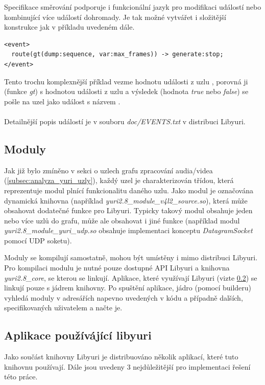 \documentclass[thesis=M,czech]{FITthesis}[2012/06/26]
\begin{document}
Specifikace směrování podporuje i funkcionální jazyk pro modifikaci událostí nebo kombinující více událostí dohromady. Je tak možné vytvářet i složitější konstrukce jak v příkladu uvedeném dále.
\\
\lstset{language=XML}
\begin{lstlisting}
<event>
  route(gt(dump:sequence, var:max_frames)) -> generate:stop;
</event>
\end{lstlisting}

Tento trochu komplexnější příklad vezme hodnotu události  z uzlu , porovná ji (funkce \textit{gt}) s hodnotou události  z uzlu  a výsledek (hodnota \textit{true} nebo \textit{false}) se pošle na uzel  jako událost s názvem .
\\ \\
Detailnější popis událostí je v souboru \textit{doc/EVENTS.txt} v distribuci Libyuri.
	
\subsection{Moduly} \label{subsec:analyza_yuri_moduly}
Jak již bylo zmíněno v sekci o uzlech grafu zpracování audia/videa (\ref{subsec:analyza_yuri_uzly}), každý uzel je charakterizován třídou, která reprezentuje modul plnící funkcionalitu daného uzlu. Jako modul je označována dynamická knihovna (například \textit{yuri2.8\_module\_v4l2\_source.so}), která může obsahovat dodatečné funkce pro Libyuri. Typicky takový modul obsahuje jeden nebo více uzlů do grafu, může ale obsahovat i jiné funkce (například modul \textit{yuri2.8\_module\_yuri\_udp.so} obsahuje implementaci konceptu \textit{DatagramSocket} pomocí UDP soketu). 

Moduly se kompilují samostatně, mohou být umístěny i mimo distribuci Libyuri. Pro kompilaci modulu je nutné pouze dostupné API Libyuri a knihovna \textit{yuri2.8\_core}, se kterou se linkují. Aplikace, které využívají Libyuri (vizte \ref{subsec:analyza_yuri_aplikace}) se linkují pouze s jádrem knihovny. Po spuštění aplikace, jádro (pomocí builderu) vyhledá moduly v adresářích napevno uvedených v kódu a případně dalších, specifikovaných uživatelem a načte je.

\subsection{Aplikace používájící libyuri} \label{subsec:analyza_yuri_aplikace}
Jako součást knihovny Libyuri je distribuováno několik aplikací, které tuto knihovnu používají. Dále jsou uvedeny 3 nejdůležitější pro implementaci řešení této práce.\\
\end{document}
